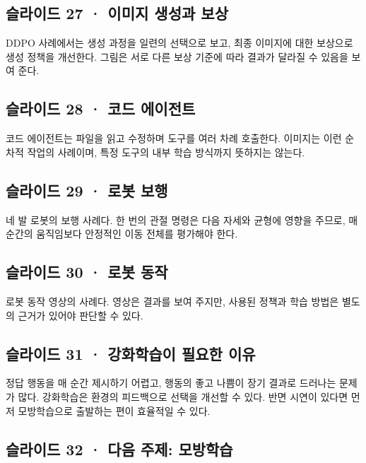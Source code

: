\documentclass[11pt,a4paper]{article}
\begin{document}
\subsection{슬라이드 27 · 이미지 생성과 보상}

DDPO 사례에서는 생성 과정을 일련의 선택으로 보고, 최종 이미지에 대한 보상으로 생성 정책을 개선한다. 그림은 서로 다른 보상 기준에 따라 결과가 달라질 수 있음을 보여 준다.\par

\subsection{슬라이드 28 · 코드 에이전트}

코드 에이전트는 파일을 읽고 수정하며 도구를 여러 차례 호출한다. 이미지는 이런 순차적 작업의 사례이며, 특정 도구의 내부 학습 방식까지 뜻하지는 않는다.\par

\subsection{슬라이드 29 · 로봇 보행}

네 발 로봇의 보행 사례다. 한 번의 관절 명령은 다음 자세와 균형에 영향을 주므로, 매 순간의 움직임보다 안정적인 이동 전체를 평가해야 한다.\par

\subsection{슬라이드 30 · 로봇 동작}

로봇 동작 영상의 사례다. 영상은 결과를 보여 주지만, 사용된 정책과 학습 방법은 별도의 근거가 있어야 판단할 수 있다.\par

\subsection{슬라이드 31 · 강화학습이 필요한 이유}

정답 행동을 매 순간 제시하기 어렵고, 행동의 좋고 나쁨이 장기 결과로 드러나는 문제가 많다. 강화학습은 환경의 피드백으로 선택을 개선할 수 있다. 반면 시연이 있다면 먼저 모방학습으로 출발하는 편이 효율적일 수 있다.\par

\subsection{슬라이드 32 · 다음 주제: 모방학습}
\end{document}
